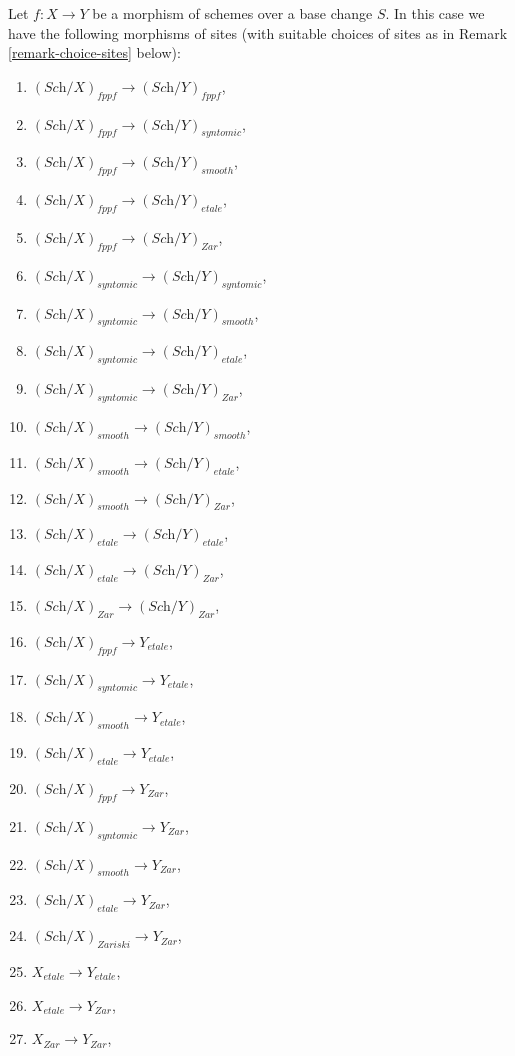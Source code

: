 \noindent
Let $f : X \to Y$ be a morphism of schemes over a base change $S$.
In this case we have the following morphisms of sites
(with suitable choices of sites as in Remark \ref{remark-choice-sites}
below):
\begin{enumerate}
\item $(\textit{Sch}/X)_{fppf} \longrightarrow (\textit{Sch}/Y)_{fppf}$,
\item $(\textit{Sch}/X)_{fppf} \longrightarrow (\textit{Sch}/Y)_{syntomic}$,
\item $(\textit{Sch}/X)_{fppf} \longrightarrow (\textit{Sch}/Y)_{smooth}$,
\item $(\textit{Sch}/X)_{fppf} \longrightarrow (\textit{Sch}/Y)_{etale}$,
\item $(\textit{Sch}/X)_{fppf} \longrightarrow (\textit{Sch}/Y)_{Zar}$,
\item $(\textit{Sch}/X)_{syntomic} \longrightarrow (\textit{Sch}/Y)_{syntomic}$,
\item $(\textit{Sch}/X)_{syntomic} \longrightarrow (\textit{Sch}/Y)_{smooth}$,
\item $(\textit{Sch}/X)_{syntomic} \longrightarrow (\textit{Sch}/Y)_{etale}$,
\item $(\textit{Sch}/X)_{syntomic} \longrightarrow (\textit{Sch}/Y)_{Zar}$,
\item $(\textit{Sch}/X)_{smooth} \longrightarrow (\textit{Sch}/Y)_{smooth}$,
\item $(\textit{Sch}/X)_{smooth} \longrightarrow (\textit{Sch}/Y)_{etale}$,
\item $(\textit{Sch}/X)_{smooth} \longrightarrow (\textit{Sch}/Y)_{Zar}$,
\item $(\textit{Sch}/X)_{etale} \longrightarrow (\textit{Sch}/Y)_{etale}$,
\item $(\textit{Sch}/X)_{etale} \longrightarrow (\textit{Sch}/Y)_{Zar}$,
\item $(\textit{Sch}/X)_{Zar} \longrightarrow (\textit{Sch}/Y)_{Zar}$,
\item $(\textit{Sch}/X)_{fppf} \longrightarrow Y_{etale}$,
\item $(\textit{Sch}/X)_{syntomic} \longrightarrow Y_{etale}$,
\item $(\textit{Sch}/X)_{smooth} \longrightarrow Y_{etale}$,
\item $(\textit{Sch}/X)_{etale} \longrightarrow Y_{etale}$,
\item $(\textit{Sch}/X)_{fppf} \longrightarrow Y_{Zar}$,
\item $(\textit{Sch}/X)_{syntomic} \longrightarrow Y_{Zar}$,
\item $(\textit{Sch}/X)_{smooth} \longrightarrow Y_{Zar}$,
\item $(\textit{Sch}/X)_{etale} \longrightarrow Y_{Zar}$,
\item $(\textit{Sch}/X)_{Zariski} \longrightarrow Y_{Zar}$,
\item $X_{etale} \longrightarrow Y_{etale}$,
\item $X_{etale} \longrightarrow Y_{Zar}$,
\item $X_{Zar} \longrightarrow Y_{Zar}$,
\end{enumerate}
